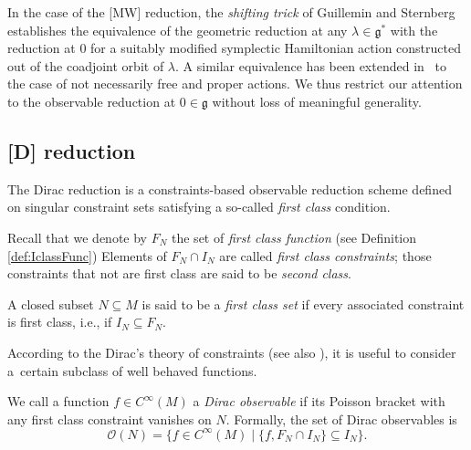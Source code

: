 \documentclass[10pt,a4paper]{amsart}
\numberwithin{equation}{section}
\renewcommand{\subset}{\subseteq}
\begin{document}
\begin{Remark}
In the case of the [MW] reduction, the \emph{shifting trick} of Guillemin and Sternberg \cite{GuilleminSternberg90} establishes the equivalence of the geometric reduction at any $\lambda\in \mathfrak{g}^*$ with the reduction at $0$ for a suitably modified symplectic Hamiltonian action constructed out of the coadjoint orbit of $\lambda$.
A similar equivalence has been extended in~\cite{Arms96} to the case of not necessarily free and proper actions.
	We thus restrict our attention to the observable reduction at $0\in \mathfrak{g}$ without loss of meaningful generality.
\end{Remark}


\subsection{{[D]} reduction}%

The Dirac reduction is a constraints-based observable reduction scheme defined on singular constraint sets satisfying a so-called \emph{first class} condition.

Recall that we denote by $F_N$ the set of \emph{first class function} (see Definition \ref{def:IclassFunc})
Elements of $F_N \cap I_N$ are called \emph{first class constraints}; those constraints that not are first class are said to be \emph{second class}.

\begin{Definition}
	A closed subset $N\subset M$ is said to be a \emph{first class set} if every associated constraint is first class, i.e., if $I_N\subset F_N$.
\end{Definition}

According to the Dirac's theory of constraints \cite{Dirac64} (see  also \cite{Sniatycki83}), it is useful to consider a~certain subclass of well behaved functions.
\begin{Definition}\label{def:Dirac_observables}
	We call a function $f\in C^\infty(M)$ a \emph{Dirac observable} if its Poisson bracket with any first class constraint vanishes on $N$. Formally, the set of Dirac observables is
	\begin{displaymath}
		\mathcal{O}(N) =
		\lbrace
 		f \in C^\infty(M)
 		\mid
		\lbrace f, F_N\cap I_N \rbrace \subset I_N
		\rbrace.
	\end{displaymath}
\end{Definition}
\end{document}
